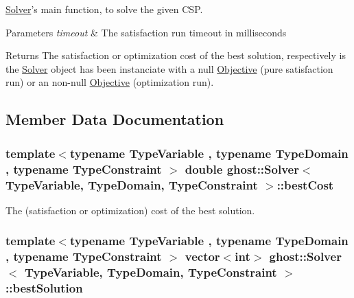 \hyperlink{classghost_1_1Solver}{Solver}'s main function, to solve the given C\-S\-P. 


\begin{DoxyParams}{Parameters}
{\em timeout} & The satisfaction run timeout in milliseconds \\
\hline
\end{DoxyParams}
\begin{DoxyReturn}{Returns}
The satisfaction or optimization cost of the best solution, respectively is the \hyperlink{classghost_1_1Solver}{Solver} object has been instanciate with a null \hyperlink{classghost_1_1Objective}{Objective} (pure satisfaction run) or an non-\/null \hyperlink{classghost_1_1Objective}{Objective} (optimization run). 
\end{DoxyReturn}


\subsection{Member Data Documentation}
\hypertarget{classghost_1_1Solver_a2fa5cf25d3417e3046aad3c1123320ed}{
\subsubsection[{best\-Cost}]{\setlength{\rightskip}{0pt plus 5cm}template$<$typename Type\-Variable , typename Type\-Domain , typename Type\-Constraint $>$ double {\bf ghost\-::\-Solver}$<$ Type\-Variable, Type\-Domain, Type\-Constraint $>$\-::best\-Cost\hspace{0.3cm}{\ttfamily [private]}}}\label{classghost_1_1Solver_a2fa5cf25d3417e3046aad3c1123320ed}


The (satisfaction or optimization) cost of the best solution. 

\hypertarget{classghost_1_1Solver_aea123e5069f4a6d20528b23a4e99d41d}{
\subsubsection[{best\-Solution}]{\setlength{\rightskip}{0pt plus 5cm}template$<$typename Type\-Variable , typename Type\-Domain , typename Type\-Constraint $>$ vector$<$int$>$ {\bf ghost\-::\-Solver}$<$ Type\-Variable, Type\-Domain, Type\-Constraint $>$\-::best\-Solution\hspace{0.3cm}{\ttfamily [private]}}}\label{classghost_1_1Solver_aea123e5069f4a6d20528b23a4e99d41d}


